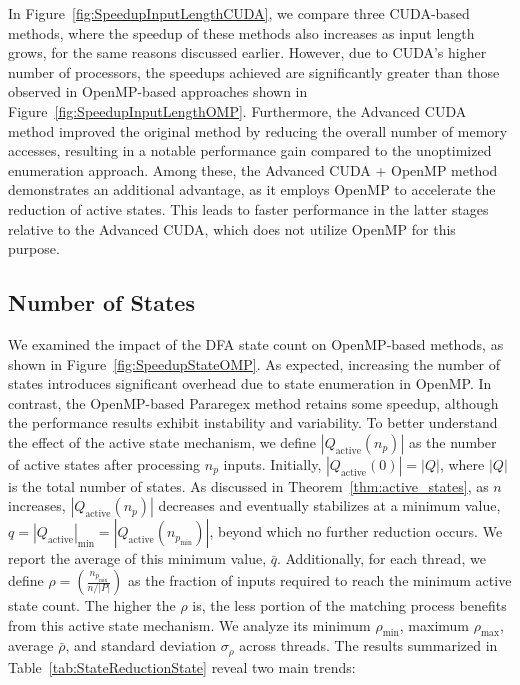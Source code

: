 \documentclass[sigconf]{acmart}
\newcommand{\minof}[1]{#1_{\text{min}}}
\newcommand{\maxof}[1]{#1_{\text{max}}}
\begin{document}
In Figure~\ref{fig:SpeedupInputLengthCUDA}, we compare three CUDA-based methods, where the speedup of these methods also increases as input length grows, for the same reasons discussed earlier. However, due to CUDA's higher number of processors, the speedups achieved are significantly greater than those observed in OpenMP-based approaches shown in Figure~\ref{fig:SpeedupInputLengthOMP}. Furthermore, the Advanced CUDA method improved the original method by reducing the overall number of memory accesses, resulting in a notable performance gain compared to the unoptimized enumeration approach. Among these, the Advanced CUDA + OpenMP method demonstrates an additional advantage, as it employs OpenMP to accelerate the reduction of active states. This leads to faster performance in the latter stages relative to the Advanced CUDA, which does not utilize OpenMP for this purpose.

\subsection{Number of States}
\label{sec:result_state}

We examined the impact of the DFA state count on OpenMP-based methods, as shown in Figure~\ref{fig:SpeedupStateOMP}. As expected, increasing the number of states introduces significant overhead due to state enumeration in OpenMP. In contrast, the OpenMP-based Pararegex method retains some speedup, although the performance results exhibit instability and variability. To better understand the effect of the active state mechanism, we define $|Q_{\text{active}}(n_p)|$ as the number of active states after processing $n_p$ inputs. Initially, $|Q_{\text{active}}(0)| = |Q|$, where $|Q|$ is the total number of states. As discussed in Theorem~\ref{thm:active_states}, as $n$ increases, $|Q_{\text{active}}(n_p)|$ decreases and eventually stabilizes at a minimum value, $q = \minof{|Q_{\text{active}}|} = |Q_{\text{active}}(n_{\minof{p}})|$, beyond which no further reduction occurs. We report the average of this minimum value, $\bar{q}$. Additionally, for each thread, we define $\rho = \left(\frac{n_{\minof{p}}}{n/|P|}\right)$ as the fraction of inputs required to reach the minimum active state count. The higher the $\rho$ is, the less portion of the matching process benefits from this active state mechanism. We analyze its minimum $\minof{\rho}$, maximum $\maxof{\rho}$, average $\bar{\rho}$, and standard deviation $\sigma_{\rho}$ across threads. The results summarized in Table~\ref{tab:StateReductionState} reveal two main trends:
\end{document}
